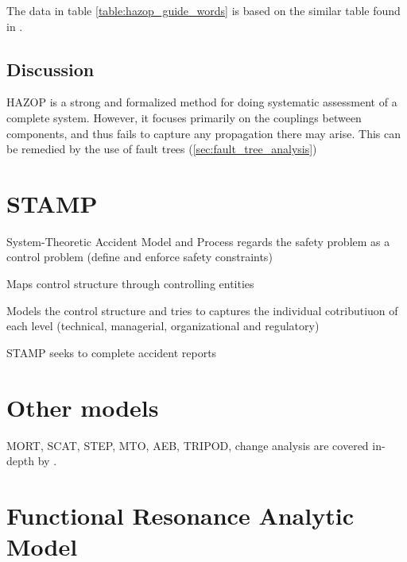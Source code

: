 \documentclass[10pt,oneside]{book}                  %
\begin{document}
The data in table \ref{table:hazop_guide_words} is based on the similar table found in \cite{storey1996safety}.


\subsection{Discussion}
HAZOP is a strong and formalized method for doing systematic assessment of a complete system. However, it focuses primarily on the couplings between components, and thus fails to capture any propagation there may arise. This can be remedied by the use of fault trees (\ref{sec:fault_tree_analysis})

\section{STAMP}
System-Theoretic Accident Model and Process regards the safety problem as a control problem (define and enforce safety constraints)

Maps control structure through controlling entities

Models the control structure and tries to captures the individual cotributiuon of each level (technical, managerial, organizational and regulatory)
\cite{leveson2012engineering}

STAMP seeks to complete accident reports
\section{Other models}
MORT, SCAT, STEP, MTO, AEB, TRIPOD, change analysis are covered in-depth by \cite{Sklet200429}.

\section{Functional Resonance Analytic Model}
\label{sec:fram}
\end{document}
